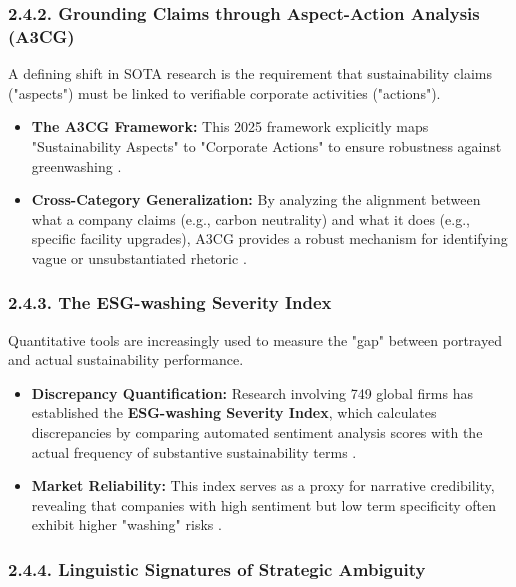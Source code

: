 \documentclass{article}
\begin{document}
\subsubsection*{2.4.2. Grounding Claims through Aspect-Action Analysis (A3CG)}

A defining shift in SOTA research is the requirement that sustainability claims ("aspects") must be linked to verifiable corporate activities ("actions").
\begin{itemize}
\item 

\textbf{The A3CG Framework:} This 2025 framework explicitly maps "Sustainability Aspects" to "Corporate Actions" to ensure robustness against greenwashing  \parencite{keane_ong_0a5de439}.\item 

\textbf{Cross-Category Generalization:} By analyzing the alignment between what a company claims (e.g., carbon neutrality) and what it does (e.g., specific facility upgrades), A3CG provides a robust mechanism for identifying vague or unsubstantiated rhetoric  \parencite{keane_ong_369a0b63}.
\end{itemize}
\subsubsection*{2.4.3. The ESG-washing Severity Index}

Quantitative tools are increasingly used to measure the "gap" between portrayed and actual sustainability performance.
\begin{itemize}
\item 

\textbf{Discrepancy Quantification:} Research involving 749 global firms has established the \textbf{ESG-washing Severity Index}, which calculates discrepancies by comparing automated sentiment analysis scores with the actual frequency of substantive sustainability terms  \parencite{valentina_lagasio_62fec386}.\item 

\textbf{Market Reliability:} This index serves as a proxy for narrative credibility, revealing that companies with high sentiment but low term specificity often exhibit higher "washing" risks  \parencite{valentina_lagasio_62fec386}.
\end{itemize}
\subsubsection*{2.4.4. Linguistic Signatures of Strategic Ambiguity}
\end{document}
